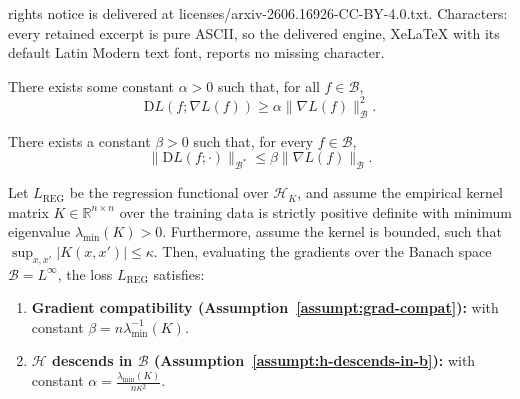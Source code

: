 \documentclass[10pt,a4paper]{amsart}
\newcommand{\B}{\mathcal{B}}
\newcommand{\D}{\mathrm{D}}
\newcommand{\R}{\mathbb{R}}
\renewcommand{\H}{\mathcal{H}}
\begin{document}
rights notice is delivered at licenses/arxiv-2606.16926-CC-BY-4.0.txt. Characters: every retained excerpt is pure ASCII, so the delivered engine, XeLaTeX with its default Latin Modern text font, reports no missing character.
\begin{assumption}[$\H$ descends in $\B$]\label{assumpt:h-descends-in-b}
    There exists some constant $\alpha>0$ such that, for all $f \in \B$,
    \[ \D L(f; \nabla L(f)) \geq \alpha \lVert \nabla L(f) \rVert_\B^2. \]
\end{assumption}

\begin{assumption}\label{assumpt:grad-compat}
    There exists a constant $\beta > 0$ such that, for every $f \in \B$,
    \[ \lVert \D L(f; \cdot) \rVert_{\B^*} \leq \beta \lVert \nabla L(f) \rVert_{\B}. \]
\end{assumption}

\begin{proposition}\label{prop:gradient-bridging-rkhs}
    Let $L_\mathrm{REG}$ be the regression functional over $\mathcal{H}_K$, and assume the empirical kernel matrix $K \in \R^{n \times n}$ over the training data is strictly positive definite with minimum eigenvalue $\lambda_{\min}(K) > 0$. Furthermore, assume the kernel is bounded, such that $\sup_{x, x'} \lvert K(x, x') \rvert \leq \kappa$. Then, evaluating the gradients over the Banach space $\mathcal{B} = L^\infty$, the loss $L_\mathrm{REG}$ satisfies:
    \begin{enumerate}
        \item[(i)] \textbf{Gradient compatibility (Assumption~\ref{assumpt:grad-compat}):} with constant $\beta = n \lambda_{\min}^{-1}(K)$.
        \item[(ii)] \textbf{$\mathcal{H}$ descends in $\mathcal{B}$ (Assumption~\ref{assumpt:h-descends-in-b}):} with constant $\alpha = \frac{\lambda_{\min}(K)}{n \kappa^2}$.
    \end{enumerate}
\end{proposition}
\end{document}
